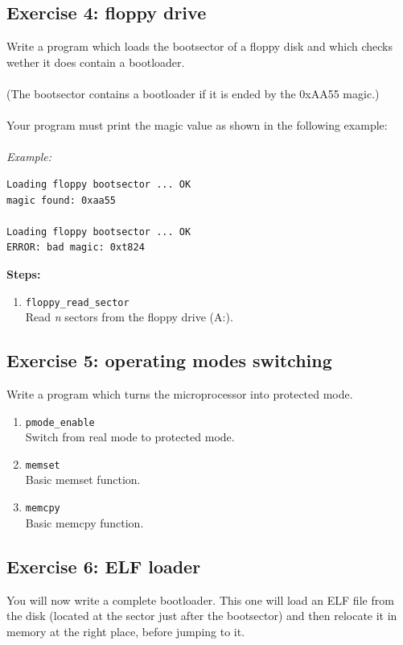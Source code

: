 \subsection*{Exercise 4: floppy drive}

Write a program which loads the bootsector of a floppy disk and which checks wether it does contain a bootloader.\\
\\
(The bootsector contains a bootloader if it is ended by the 0xAA55 magic.)\\
\\
Your program must print the magic value as shown in the following example:\\
\\
{\em Example:}
\begin{verbatim}
Loading floppy bootsector ... OK
magic found: 0xaa55

Loading floppy bootsector ... OK
ERROR: bad magic: 0xt824
\end{verbatim}
{\bf Steps:}
  \begin{enumerate}
  \item {\tt floppy\_read\_sector}\\
  Read {\em n} sectors from the floppy drive (A:).
  \end{enumerate}

\subsection*{Exercise 5: operating modes switching}

Write a program which turns the microprocessor into protected mode.

  \begin{enumerate}
  \item {\tt pmode\_enable}\\
  Switch from real mode to protected mode.
  \item {\tt memset}\\
  Basic memset function.
  \item {\tt memcpy}\\
  Basic memcpy function.
  \end{enumerate}

\subsection*{Exercise 6: ELF loader}

You will now write a complete bootloader. This one will load an ELF
file from the disk (located at the sector just after the bootsector)
and then relocate it in memory at the right place, before jumping to
it.

